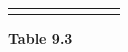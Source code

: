 {\begin{center}
\begin{xtabular*}{\mytablewidth}[t]{|p{10\mystarwidth}|p{10\mystarwidth}|p{10\mystarwidth}|p{10\mystarwidth}|p{10\mystarwidth}|p{10\mystarwidth}|p{10\mystarwidth}|p{10\mystarwidth}|}
         &
    
    
         &
    
    
         &
    
    
         &
    
    
         &
    
    
     \tabularnewline{}
    \end{xtabular*}
      \end{center}
    \begin{center}{\small\bfseries Table 9.3}\end{center}
    
    \addtocounter{footnote}{-0}
    
        }%
      
    \par
  
      
      

      \label{m39253*uid64}
